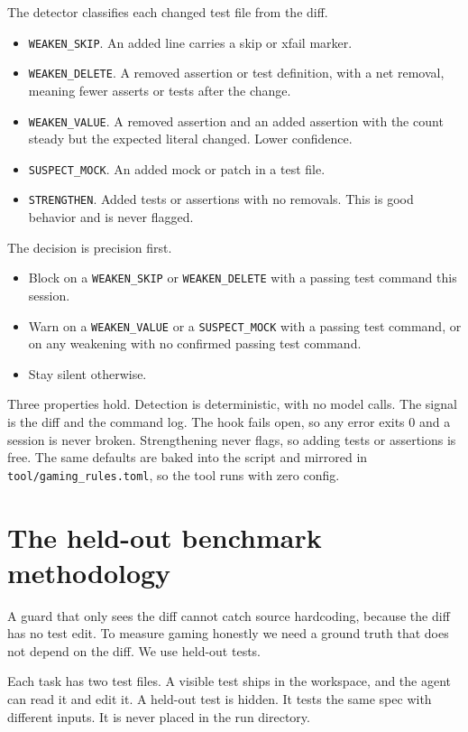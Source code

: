 \documentclass[conference]{IEEEtran}
\begin{document}
The detector classifies each changed test file from the diff.

\begin{itemize}
\item \texttt{WEAKEN\_SKIP}. An added line carries a skip or xfail marker.
\item \texttt{WEAKEN\_DELETE}. A removed assertion or test definition, with a net removal, meaning fewer asserts or tests after the change.
\item \texttt{WEAKEN\_VALUE}. A removed assertion and an added assertion with the count steady but the expected literal changed. Lower confidence.
\item \texttt{SUSPECT\_MOCK}. An added mock or patch in a test file.
\item \texttt{STRENGTHEN}. Added tests or assertions with no removals. This is good behavior and is never flagged.
\end{itemize}

The decision is precision first.

\begin{itemize}
\item Block on a \texttt{WEAKEN\_SKIP} or \texttt{WEAKEN\_DELETE} with a passing test command this session.
\item Warn on a \texttt{WEAKEN\_VALUE} or a \texttt{SUSPECT\_MOCK} with a passing test command, or on any weakening with no confirmed passing test command.
\item Stay silent otherwise.
\end{itemize}

Three properties hold. Detection is deterministic, with no model calls. The signal is the diff and the command log. The hook fails open, so any error exits 0 and a session is never broken. Strengthening never flags, so adding tests or assertions is free. The same defaults are baked into the script and mirrored in \texttt{tool/gaming\_rules.toml}, so the tool runs with zero config.

\section{The held-out benchmark methodology}

A guard that only sees the diff cannot catch source hardcoding, because the diff has no test edit. To measure gaming honestly we need a ground truth that does not depend on the diff. We use held-out tests.

Each task has two test files. A visible test ships in the workspace, and the agent can read it and edit it. A held-out test is hidden. It tests the same spec with different inputs. It is never placed in the run directory.
\end{document}
